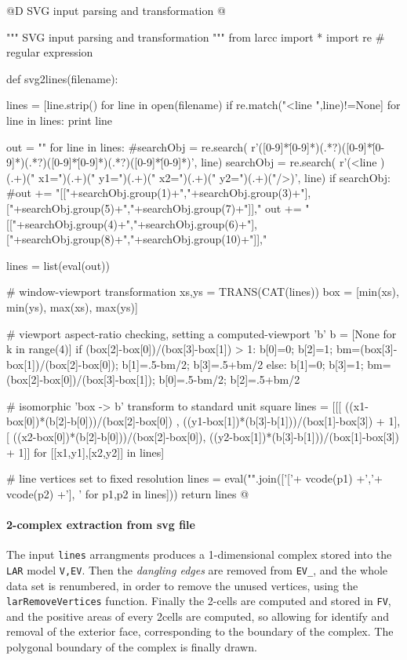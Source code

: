 \documentclass[11pt,oneside]{article}    %
\begin{document}
@D SVG input parsing and transformation
@{""" SVG input parsing and transformation """
from larcc import *
import re # regular expression

def svg2lines(filename):

    lines = [line.strip() for line in open(filename) if re.match("<line ",line)!=None]   
    for line in lines: print line
        
    out = ""    
    for line in lines:
        #searchObj = re.search( r'([0-9]*\.[0-9]*)(.*?)([0-9]*\.[0-9]*)(.*?)([0-9]*\.[0-9]*)(.*?)([0-9]*\.[0-9]*)', line)
        searchObj = re.search( r'(<line )(.+)(" x1=")(.+)(" y1=")(.+)(" x2=")(.+)(" y2=")(.+)("/>)', line)
        if searchObj:
            #out += "[["+searchObj.group(1)+","+searchObj.group(3)+"], ["+searchObj.group(5)+","+searchObj.group(7)+"]],"
            out += "[["+searchObj.group(4)+","+searchObj.group(6)+"], ["+searchObj.group(8)+","+searchObj.group(10)+"]],"
    
    lines = list(eval(out))
    
    # window-viewport transformation
    xs,ys = TRANS(CAT(lines))
    box = [min(xs), min(ys), max(xs), max(ys)]
    
    # viewport aspect-ratio checking, setting a computed-viewport 'b'
    b = [None for k in range(4)]
    if (box[2]-box[0])/(box[3]-box[1]) > 1:  
        b[0]=0; b[2]=1; bm=(box[3]-box[1])/(box[2]-box[0]); b[1]=.5-bm/2; b[3]=.5+bm/2
    else: 
        b[1]=0; b[3]=1; bm=(box[2]-box[0])/(box[3]-box[1]); b[0]=.5-bm/2; b[2]=.5+bm/2
    
    # isomorphic 'box -> b' transform to standard unit square
    lines = [[[ 
    ((x1-box[0])*(b[2]-b[0]))/(box[2]-box[0]) , 
    ((y1-box[1])*(b[3]-b[1]))/(box[1]-box[3]) + 1], [
    ((x2-box[0])*(b[2]-b[0]))/(box[2]-box[0]), 
    ((y2-box[1])*(b[3]-b[1]))/(box[1]-box[3]) + 1]]  
          for [[x1,y1],[x2,y2]] in lines]
    
    # line vertices set to fixed resolution
    lines = eval("".join(['['+ vcode(p1) +','+ vcode(p2) +'], ' for p1,p2 in lines]))
    return lines
@}


\paragraph{2-complex extraction from svg file}
The input \texttt{lines} arrangments produces a 1-dimensional complex stored into the \texttt{LAR} model \texttt{V,EV}. Then the \emph{dangling edges} are removed from \texttt{EV\_},
and the whole data set is renumbered, in order to remove the unused vertices, using the \texttt{larRemoveVertices} function.
Finally the 2-cells are computed and stored in \texttt{FV}, and the positive areas of every 2cells are computed, so allowing for identify and removal of the exterior face, 
corresponding to the boundary of the complex.
The polygonal boundary of the complex is finally drawn.
\end{document}
